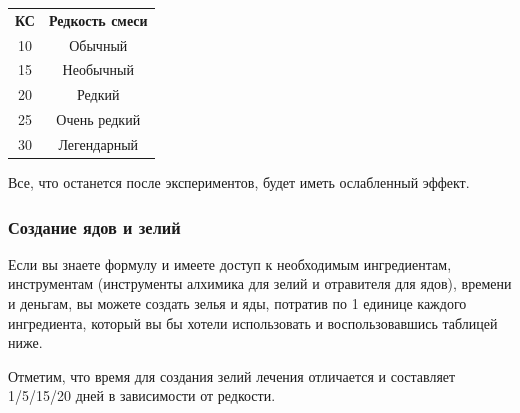\documentclass[a4paper, 9pt, twocolumn]{book}
\begin{document}
	\begin{table}[H]
		
		\centering
		
		\begin{tabularx}{0.8\linewidth}{c C}
			
			\textbf{КС} & \textbf{Редкость смеси} \\
			
			10 & Обычный \\
			
			15 & Необычный \\
			
			20 & Редкий \\
			
			25 & Очень редкий \\
			
			30 & Легендарный \\
			
		\end{tabularx}
	
	\medspace
	
	\flushleft
	
	Все, что останется после экспериментов, будет иметь ослабленный эффект.
	\end{table}
	
	
	

	
	\subsubsection{Создание ядов и зелий}
	
	Если вы знаете формулу и имеете доступ к необходимым ингредиентам, инструментам (инструменты алхимика для зелий и отравителя для ядов), времени и деньгам, вы можете создать зелья и яды, потратив по 1 единице каждого ингредиента, который вы бы хотели использовать и воспользовавшись таблицей ниже.
	
	Отметим, что время для создания зелий лечения отличается и составляет 1/5/15/20 дней в зависимости от редкости.
	
\end{document}
